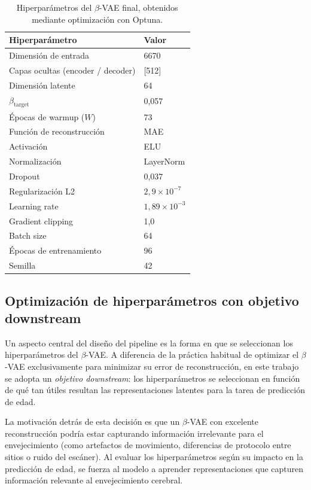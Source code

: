 \begin{table}[H]
\centering
\caption{Hiperparámetros del $\beta$-VAE final, obtenidos mediante optimización con Optuna.}
\label{tab:vae_hparams}
\begin{tabular}{ll}
\toprule
\textbf{Hiperparámetro} & \textbf{Valor} \\
\midrule
Dimensión de entrada & 6670 \\
Capas ocultas (encoder / decoder) & [512] \\
Dimensión latente & 64 \\
$\beta_{\text{target}}$ & 0,057 \\
Épocas de warmup ($W$) & 73 \\
Función de reconstrucción & MAE \\
Activación & ELU \\
Normalización & LayerNorm \\
Dropout & 0,037 \\
Regularización L2 & $2{,}9 \times 10^{-7}$ \\
Learning rate & $1{,}89 \times 10^{-3}$ \\
Gradient clipping & 1,0 \\
Batch size & 64 \\
Épocas de entrenamiento & 96 \\
Semilla & 42 \\
\bottomrule
\end{tabular}
\end{table}

\subsection{Optimización de hiperparámetros con objetivo downstream}
\label{sec:optuna_vae}

Un aspecto central del diseño del pipeline es la forma en que se seleccionan los hiperparámetros del $\beta$-VAE. A diferencia de la práctica habitual de optimizar el $\beta$-VAE exclusivamente para minimizar su error de reconstrucción, en este trabajo se adopta un \textit{objetivo downstream}: los hiperparámetros se seleccionan en función de qué tan útiles resultan las representaciones latentes para la tarea de predicción de edad.

La motivación detrás de esta decisión es que un $\beta$-VAE con excelente reconstrucción podría estar capturando información irrelevante para el envejecimiento (como artefactos de movimiento, diferencias de protocolo entre sitios o ruido del escáner). Al evaluar los hiperparámetros según su impacto en la predicción de edad, se fuerza al modelo a aprender representaciones que capturen información relevante al envejecimiento cerebral.

